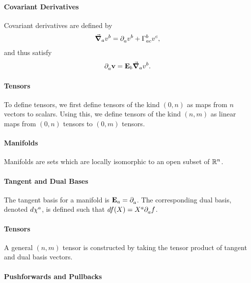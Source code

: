 \paragraph{Covariant Derivatives}
Covariant derivatives are defined by
\begin{align*}
	\dcov{a}{v^{b}} = \del{a}{v^{b}} + \chris{b}{a}{c}v^{c},
\end{align*}
and thus satisfy
\begin{align*}
	\partial^{}_{a}\vb{v} = \vb{E}_{b}\grad_{a}{v^{b}}.
\end{align*}

\paragraph{Tensors}
To define tensors, we first define tensors of the kind $(0, n)$ as maps from $n$ vectors to scalars. Using this, we define tensors of the kind $(n, m)$ as linear maps from $(0, n)$ tensors to $(0, m)$ tensors.

\paragraph{Manifolds}
Manifolds are sets which are locally isomorphic to an open subset of $\mathbb{R}^{n}$.

\paragraph{Tangent and Dual Bases}
The tangent basis for a manifold is $\vb{E}_{a} = \partial^{}_{a}$. The corresponding dual basis, denoted $d\chi^{a}$, is defined such that $df(X) = X^{a}\partial^{}_{a}f$.

\paragraph{Tensors}
A general $(n, m)$ tensor is constructed by taking the tensor product of tangent and dual basis vectors.

\paragraph{Pushforwards and Pullbacks}